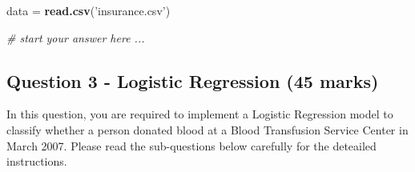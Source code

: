 \documentclass[
]{article}
\newenvironment{Shaded}{\begin{snugshade}}{\end{snugshade}}
\newcommand{\CommentTok}[1]{\textcolor[rgb]{0.56,0.35,0.01}{\textit{#1}}}
\newcommand{\KeywordTok}[1]{\textcolor[rgb]{0.13,0.29,0.53}{\textbf{#1}}}
\newcommand{\NormalTok}[1]{#1}
\newcommand{\StringTok}[1]{\textcolor[rgb]{0.31,0.60,0.02}{#1}}
\begin{document}
\begin{Shaded}
\begin{Highlighting}[]
\NormalTok{data =}\StringTok{ }\KeywordTok{read.csv}\NormalTok{(}\StringTok{'insurance.csv'}\NormalTok{)}
\end{Highlighting}
\end{Shaded}

\begin{Shaded}
\begin{Highlighting}[]
\CommentTok{# start your answer here ...}
\end{Highlighting}
\end{Shaded}

\hypertarget{question-3---logistic-regression-45-marks}{%
\subsection{Question 3 - Logistic Regression (45
marks)}\label{question-3---logistic-regression-45-marks}}

In this question, you are required to implement a Logistic Regression
model to classify whether a person donated blood at a Blood Transfusion
Service Center in March 2007. Please read the sub-questions below
carefully for the deteailed instructions.
\end{document}
